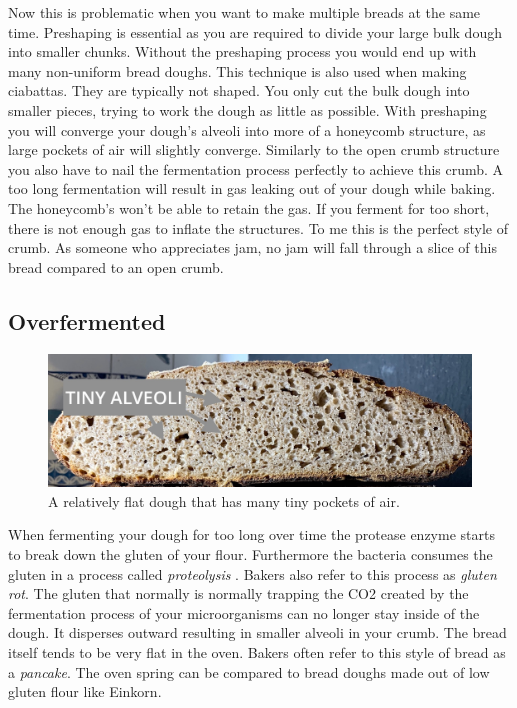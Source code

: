 Now this is problematic when you want to
make multiple breads at the same time. Preshaping is essential as you are required
to divide your large bulk dough into smaller chunks. Without the preshaping
process you would end up with many non-uniform bread doughs. This technique is
also used when making ciabattas. They are typically not shaped. You only cut the
bulk dough into smaller pieces, trying to work the dough as little as possible.
With preshaping you will converge your dough's alveoli into more of a honeycomb structure,
as large pockets of air will slightly converge. Similarly to the open crumb structure
you also have to nail the fermentation process perfectly to achieve this crumb.
A too long fermentation will result in gas leaking out of your dough while baking.
The honeycomb's won't be able to retain the gas. If you ferment for too short,
there is not enough gas to inflate the structures. To me this is the perfect
style of crumb. As someone who appreciates jam, no jam will fall through a slice
of this bread compared to an open crumb.

\subsection{Overfermented}
\label{sec:overfermented-dough}

\begin{figure}
  \includegraphics[width=\textwidth]{fermented-too-long}
  \caption{A relatively flat dough that has many tiny pockets of air.}
  \label{fig:fermented-too-long}
\end{figure}

When fermenting your dough for too long over time the protease enzyme starts to
break down the gluten of your flour. Furthermore the bacteria consumes the gluten
in a process called {\it proteolysis} \cite{raffaella+di+cagno}.
Bakers also refer to this process as {\it gluten rot}.
The gluten that normally is normally trapping the CO2 created
by the fermentation process of your microorganisms can no longer stay inside of
the dough. It disperses outward resulting in smaller alveoli in your crumb.
The bread itself tends to be very flat in the oven. Bakers often refer
to this style of bread as a {\it pancake}. The oven spring can be compared
to bread doughs made out of low gluten flour like Einkorn.

